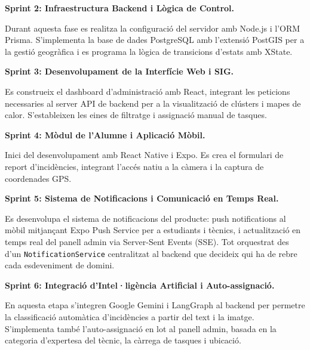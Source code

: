 \documentclass[10pt,a4paper,twocolumn,twoside]{article}
\begin{document}
		\begin{flushleft}
			\textbf{Sprint 2: Infraestructura Backend i Lògica de Control.} \\
		\end{flushleft}
		Durant aquesta fase es realitza la configuració del servidor amb Node.js i l'ORM Prisma. S'implementa la base de dades PostgreSQL amb l'extensió PostGIS per a la gestió geogràfica i es programa la lògica de transicions d'estats amb XState.
		
		\begin{flushleft}
			\textbf{Sprint 3: Desenvolupament de la Interfície Web i SIG. } \\
		\end{flushleft}
		Es construeix el dashboard d'administració amb React, integrant les peticions necessaries al server API de backend per a la visualització de clústers i mapes de calor. S'estableixen les eines de filtratge i assignació manual de tasques.
		
		\begin{flushleft}
			\textbf{Sprint 4: Mòdul de l'Alumne i Aplicació Mòbil. } \\
		\end{flushleft}
		Inici del desenvolupament amb React Native i Expo\cite{3}. Es crea el formulari de report d'incidències, integrant l'accés natiu a la càmera i la captura de coordenades GPS.
		
		\begin{flushleft}
			\textbf{Sprint 5: Sistema de Notificacions i Comunicació en Temps Real. } \\
		\end{flushleft}
		Es desenvolupa el sistema de notificacions del producte: push notifications al mòbil mitjançant Expo Push Service per a estudiants i tècnics, i actualització en temps real del panell admin via Server-Sent Events (SSE). Tot orquestrat des d'un \texttt{NotificationService} centralitzat al backend que decideix qui ha de rebre cada esdeveniment de domini.
		
		\begin{flushleft}
			\textbf{Sprint 6: Integració d'Intel·ligència Artificial i Auto-assignació.} \\
		\end{flushleft}
		En aquesta etapa s'integren Google Gemini i LangGraph al backend per permetre la classificació automàtica d'incidències a partir del text i la imatge. S'implementa també l'auto-assignació en lot al panell admin, basada en la categoria d'expertesa del tècnic, la càrrega de tasques i ubicació.
		
\end{document}
